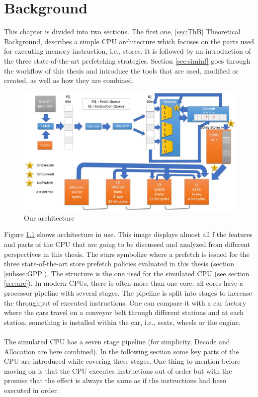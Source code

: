 \chapter{Background}
\label{chap:bg}
This chapter is divided into two sections. The first one, \ref{sec:ThB} Theoretical Background,
describes a simple CPU architecture which focuses on the parts used
for executing memory instruction, i.e., stores. It is followed by an introduction of
the three state-of-the-art prefetching strategies. Section \ref{sec:siminf}  goes through the
workflow of this thesis and introduce the tools that are used, modified or created, as
well as how they are combined.

\begin{figure}[h]
\centering
\includegraphics[width=12cm]{figure/thoeratical-arc.jpg}
\caption{Our architecture}
\label{img:arc}
\end{figure}
Figure \ref{img:arc} shows architecture in use. This image displays almost all f
the features and parts of the CPU that are going to be discussed and analyzed from different
perspectives in this thesis. The stars symbolize where a prefetch is issued for the three state-of-the-art store prefetch policies evaluated in this thesis (section \ref{subsec:GPP}). The structure is the one used for the simulated CPU (see section \ref{sec:arc}). In modern CPUs, there is often more than one core; all cores have a processor pipeline with several stages. The pipeline is split into stages to increase the throughput of executed instructions. One can compare it with a car factory where the cars travel on a conveyor belt through different stations and
at each station, something is installed within the car, i.e., seats, wheels or the engine.
\\ \\
The simulated CPU has a seven stage pipeline (for simplicity, Decode and Allocation are here combined). In the following section some key parts of the CPU are introduced while covering these stages. One thing to mention before moving
on is that the CPU executes instructions out of order but with the promise that the effect
is always the same as if the instructions had been executed in order.
 \\ \\

